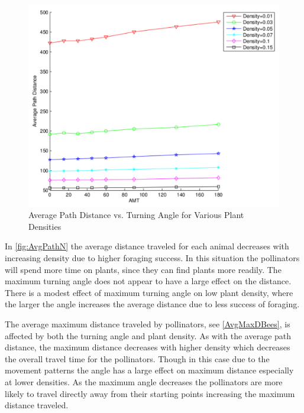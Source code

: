 \begin{figure}
  \begin{center}
  \includegraphics[scale=0.5]{PathVsAMT.pdf}
  \end{center}
  \caption{\small Average Path Distance vs. Turning Angle for Various Plant Densities}
  \label{fig:AvgPathN}
\end{figure}

In \autoref{fig:AvgPathN} the average distance traveled for each animal
decreases with increasing density due to higher foraging success.  In this
situation the pollinators will spend more time on plants, since they can find plants
more readily.  The maximum turning angle does not appear to have a large effect
on the distance.  There is a modest effect of maximum turning angle on low plant
density, where the larger the angle increases the average distance due to less
success of foraging.

The average maximum distance traveled by pollinators, see \autoref{AvgMaxDBees}, is
affected by both the turning angle and plant density. As with the average path
distance, the maximum distance decreases with higher density which decreases the
overall travel time for the pollinators.  Though in this case due to the movement
patterns the angle has a large effect on maximum distance especially at lower
densities.  As the maximum angle decreases the pollinators are more likely to travel
directly away from their starting points increasing the maximum distance
traveled.

